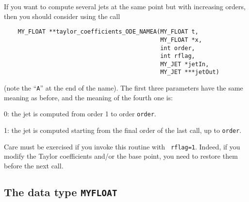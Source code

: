 \documentclass[10pt]{article}
\theoremstyle{remark}
\newcommand{\myfloat}{{\tt MY\symbol{95}FLOAT}}
\begin{document}
If you want to compute several jets at the same point but with
increasing orders, then you should consider using the call
\begin{verbatim}
    MY_FLOAT **taylor_coefficients_ODE_NAMEA(MY_FLOAT t,
                                             MY_FLOAT *x,
                                             int order,
                                             int rflag,
                                             MY_JET *jetIn, 
                                             MY_JET ***jetOut)
\end{verbatim}
(note the ``{\tt A}'' at the end of the name). The first three
parameters have the same meaning as before, and the meaning of the
fourth one is:
\begin{description}
  \item 0: the jet is computed from order 1 to order {\tt order}.
  \item 1: the jet is computed starting from the final order of the
    last call, up to {\tt order}.
\end{description}

Care must be exercised if you invoke this routine with {\tt
  rflag=1}. Indeed, if you modify the Taylor coefficients and/or the
base point, you need to restore them before the next call.


\subsection{The data type \myfloat{}} \label{sec:myfloat}
\end{document}
